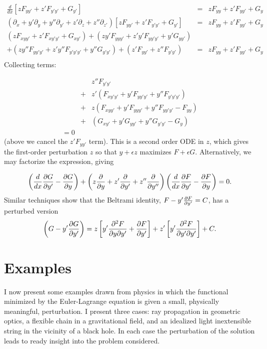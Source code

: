 \documentclass[pdflatex,sn-mathphys-num]{sn-jnl}%
\theoremstyle{thmstyleone}%
\theoremstyle{thmstyletwo}%
\theoremstyle{thmstylethree}%
\begin{document}
\begin{eqnarray}
\frac{d}{dx}\left[zF_{yy'} + z'F_{y'y'} + G_{y'}\right]
&=& zF_{yy} + z'F_{yy'} + G_{y}\nonumber\\
\left(\partial_{x} + y'\partial_{y} + y''\partial_{y'} + z'\partial_{z} + z''\partial_{z'}\right)
\left[zF_{yy'} + z'F_{y'y'} + G_{y'}\right]
&=& zF_{yy} + z'F_{yy'} + G_{y}\nonumber\\
(zF_{xyy'} + z'F_{xy'y'} + G_{xy'})
+ (zy'F_{yyy'} + z'y'F_{yy'y'} + y'G_{yy'})\nonumber\\
+ ( zy''F_{yy'y'} + z'y''F_{y'y'y'} + y''G_{y'y'})
+ (z'F_{yy'} + z''F_{y'y'})
&=& zF_{yy} + z'F_{yy'} + G_{y}\nonumber\\
\end{eqnarray}
%
Collecting terms:

\begin{eqnarray}
&{}& z''F_{y'y'}\nonumber\\
&+& z'(F_{xy'y'} + y'F_{yy'y'} + y''F_{y'y'y'})\nonumber\\
&+& z (F_{xyy'} + y'F_{yyy'} + y''F_{yy'y'}-F_{yy})\nonumber\\
&+& (G_{xy'} + y'G_{yy'} + y''G_{y'y'}- G_{y})\nonumber\\
= 0
\end{eqnarray}
%
(above we cancel the $z'F_{yy'}$ term). This is a second order ODE in
$z$, which gives the first-order perturbation $z$ so that $y+\epsilon
z$ maximizes $F+\epsilon G$.  Alternatively, we may factorize the
expression, giving

\begin{equation}\label{factorized_eqn}
\left(\frac{d}{dx}\frac{\partial{G}}{\partial{y'}} - \frac{\partial{G}}{\partial{y}}\right) + \left(z\frac{\partial{}}{\partial{y}} + z'\frac{\partial{}}{\partial{y'}} + z''\frac{\partial{}}{\partial{y''}}\right)
\left(\frac{d}{dx}\frac{\partial{F}}{\partial{y'}} - \frac{\partial{F}}{\partial{y}}\right)=0.
\end{equation}
%
Similar techniques show that the Beltrami identity,
$F-y'\frac{\partial{F}}{\partial{y'}}=C$, has a perturbed version
%
\begin{equation}\label{beltrami}
  \left(G-y'\frac{\partial{G}}{\partial{y'}}\right)
  =
    z \left[y'\frac{\partial^2F}{\partial y\partial y'} + \frac{\partial{F}}{\partial{y'}}\right]
  + z'\left[y'\frac{\partial^2F}{\partial y'\partial y'}\right] + C.
\end{equation}

\section{Examples}

I now present some examples drawn from physics in which the functional
minimized by the Euler-Lagrange equation is given a small, physically
meaningful, perturbation.  I present three cases: ray propagation in
geometric optics, a flexible chain in a gravitational field, and an
idealized light inextensible string in the vicinity of a black hole.
In each case the perturbation of the solution leads to ready insight
into the problem considered.
\end{document}
